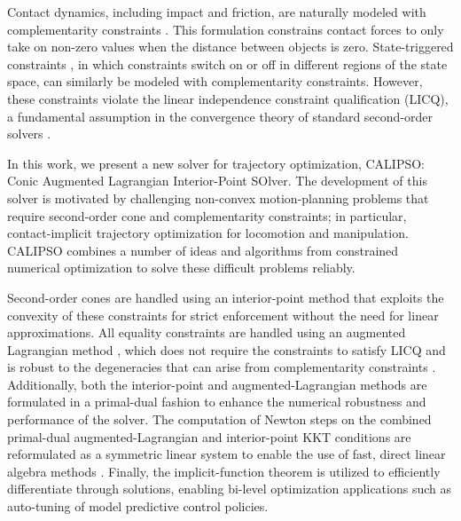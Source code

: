 Contact dynamics, including impact and friction, are naturally modeled with complementarity constraints \cite{scheel2000mathematical}. This formulation constrains contact forces to only take on non-zero values when the distance between objects is zero. State-triggered constraints \cite{szmuk2019real}, in which constraints switch on or off in different regions of the state space, can similarly be modeled with complementarity constraints. However, these constraints violate the linear independence constraint qualification (LICQ), a fundamental assumption in the convergence theory of standard second-order solvers \cite{nocedal2006numerical, biegler2010nonlinear}.

In this work, we present a new solver for trajectory optimization, CALIPSO: Conic Augmented Lagrangian Interior-Point SOlver. The development of this solver is motivated by challenging non-convex motion-planning problems that require second-order cone and complementarity constraints; in particular, contact-implicit trajectory optimization \cite{posa2014direct, manchester2020variational} for locomotion and manipulation. CALIPSO combines a number of ideas and algorithms from constrained numerical optimization to solve these difficult problems reliably. 

Second-order cones are handled using an interior-point method \cite{vandenberghe2010cvxopt} that exploits the convexity of these constraints for strict enforcement without the need for linear approximations. All equality constraints are handled using an augmented Lagrangian method \cite{bertsekas2014constrained}, which does not require the constraints to satisfy LICQ and is robust to the degeneracies that can arise from complementarity constraints \cite{izmailov2012global}. Additionally, both the interior-point and augmented-Lagrangian methods are formulated in a primal-dual fashion to enhance the numerical robustness and performance of the solver. The computation of Newton steps on the combined primal-dual augmented-Lagrangian and interior-point KKT conditions are reformulated as a symmetric linear system to enable the use of fast, direct linear algebra methods \cite{davis2005algorithm}. Finally, the implicit-function theorem \cite{dini1907lezioni,amos2017optnet} is utilized to efficiently differentiate through solutions, enabling bi-level optimization applications such as auto-tuning of model predictive control policies.

